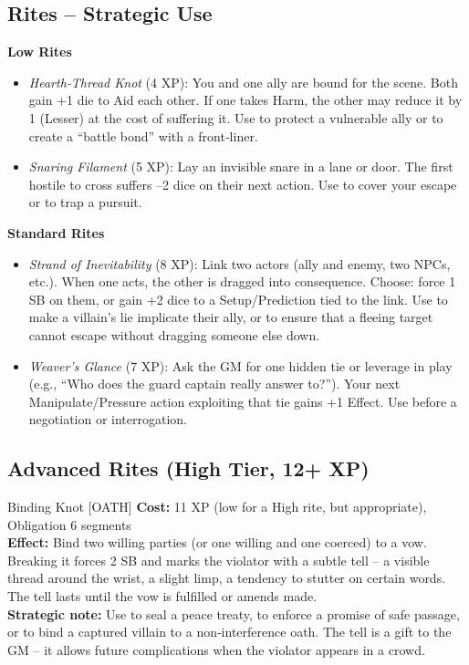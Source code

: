 \documentclass[10pt,a5paper]{book}
\begin{document}
\subsection*{Rites – Strategic Use}

\textbf{Low Rites}
\begin{itemize}
    \item \textit{Hearth‑Thread Knot} (4 XP): You and one ally are bound for the scene. Both gain +1 die to Aid each other. If one takes Harm, the other may reduce it by 1 (Lesser) at the cost of suffering it. Use to protect a vulnerable ally or to create a “battle bond” with a front‑liner.
    \item \textit{Snaring Filament} (5 XP): Lay an invisible snare in a lane or door. The first hostile to cross suffers –2 dice on their next action. Use to cover your escape or to trap a pursuit.
\end{itemize}

\textbf{Standard Rites}
\begin{itemize}
    \item \textit{Strand of Inevitability} (8 XP): Link two actors (ally and enemy, two NPCs, etc.). When one acts, the other is dragged into consequence. Choose: force 1 SB on them, or gain +2 dice to a Setup/Prediction tied to the link. Use to make a villain’s lie implicate their ally, or to ensure that a fleeing target cannot escape without dragging someone else down.
    \item \textit{Weaver’s Glance} (7 XP): Ask the GM for one hidden tie or leverage in play (e.g., “Who does the guard captain really answer to?”). Your next Manipulate/Pressure action exploiting that tie gains +1 Effect. Use before a negotiation or interrogation.
\end{itemize}

\subsection*{Advanced Rites (High Tier, 12+ XP)}

\begin{patronbox}{Binding Knot [OATH]}
\textbf{Cost:} 11 XP (low for a High rite, but appropriate), Obligation 6 segments \\
\textbf{Effect:} Bind two willing parties (or one willing and one coerced) to a vow. Breaking it forces 2 SB and marks the violator with a subtle tell – a visible thread around the wrist, a slight limp, a tendency to stutter on certain words. The tell lasts until the vow is fulfilled or amends made. \\
\textbf{Strategic note:} Use to seal a peace treaty, to enforce a promise of safe passage, or to bind a captured villain to a non‑interference oath. The tell is a gift to the GM – it allows future complications when the violator appears in a crowd.
\end{patronbox}
\end{document}
